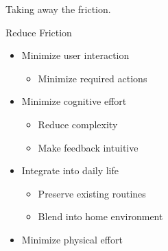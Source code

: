 \begin{frame}{Taking away the friction.}
	\begin{block}{Reduce Friction}
		\begin{itemize}
			\item Minimize user interaction
			\begin{itemize}
				\item Minimize required actions
			\end{itemize}

			\item Minimize cognitive effort\cite{felpete2026}
			\begin{itemize}
				\item Reduce complexity
				\item Make feedback intuitive
			\end{itemize}

			\item Integrate into daily life\cite{phillips1993}
			\begin{itemize}
				\item Preserve existing routines
				\item Blend into home environment
			\end{itemize}

			\item Minimize physical effort
		\end{itemize}
	\end{block}
\end{frame}
